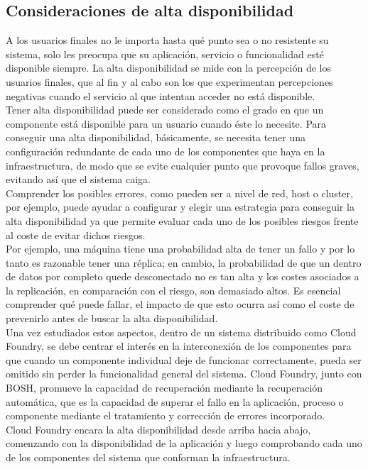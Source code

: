 \documentclass[a4paper,11pt]{article}
\begin{document}
\subsection{Consideraciones de alta disponibilidad}
A los usuarios finales no le importa hasta qué punto sea o no resistente su sistema, solo les preocupa que su aplicación, servicio o funcionalidad esté disponible siempre. La alta disponibilidad se mide con la percepción de los usuarios finales, que al fin y al cabo son los que experimentan percepciones negativas cuando el servicio al que intentan acceder no está disponible.\\
Tener alta disponibilidad puede ser considerado como el grado en que un componente está disponible para un usuario cuando éste lo necesite. Para conseguir una alta disponibilidad, básicamente, se necesita tener una configuración redundante de cada uno de los
componentes que haya en la infraestructura, de modo que se evite cualquier punto que provoque fallos graves, evitando así que el sistema caiga.\\
Comprender los posibles errores, como pueden ser a nivel de red, host o cluster, por ejemplo, puede ayudar a configurar y elegir una estrategia para conseguir la alta disponibilidad ya que permite evaluar cada uno de los posibles riesgos frente al coste de evitar dichos riesgos.\\
Por ejemplo, una máquina tiene una probabilidad alta de tener un fallo y por lo tanto es razonable tener una réplica; en cambio, la probabilidad de que un dentro de datos por completo quede desconectado no es tan alta y los costes asociados a la replicación, en comparación con el riesgo, son demasiado altos. Es esencial comprender qué puede fallar, el impacto de que esto ocurra así como el coste de prevenirlo antes de buscar la alta disponibilidad.\\
Una vez estudiados estos aspectos, dentro de un sistema distribuido como Cloud Foundry, se debe centrar el interés en la interconexión de los componentes para que cuando un componente individual deje de funcionar correctamente, pueda ser omitido sin perder la funcionalidad general del sistema. Cloud Foundry, junto con BOSH, promueve la capacidad de recuperación mediante la recuperación automática, que es la capacidad de superar el fallo en la aplicación, proceso o componente mediante el tratamiento y corrección de errores incorporado.\\
Cloud Foundry encara la alta disponibilidad desde arriba hacia abajo, comenzando con la disponibilidad de la aplicación y luego comprobando cada uno de los componentes del sistema que conforman la infraestructura.
\end{document}
